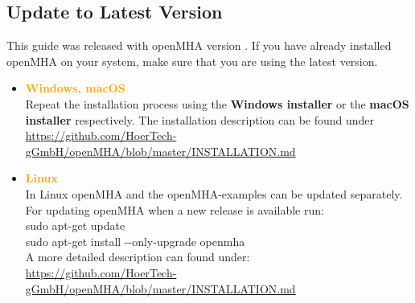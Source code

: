 \documentclass[11pt,a4paper,twoside]{article}
\newcommand{\+}{\discretionary{\mbox{\scriptsize$\hookleftarrow$}}{}{}}
\begin{document}

\subsection{Update to Latest Version}

This guide was released with openMHA version \MHAversion.
If you have already installed openMHA on your system, make
sure that you are using the latest version. \\
\begin{itemize}
\item \textcolor{orange}{\textbf{Windows, macOS}} \\
Repeat the installation process using the \textbf{Windows installer} or the \textbf{macOS installer} respectively. The installation description can be found under \url{https://github.com/HoerTech-gGmbH/openMHA/blob/master/INSTALLATION.md}
\item \textcolor{orange}{\textbf{Linux}} \\
In Linux openMHA and the openMHA-examples can be updated separately. For updating openMHA when a new release is available run: \\ 
{\ttfamily sudo apt-get update} \\
{{\ttfamily sudo apt-get install -{}-only-upgrade openmha}} \\
A more detailed description can found under: \\
\url{https://github.com/HoerTech-gGmbH/openMHA/blob/master/INSTALLATION.md}
\end{itemize}
\end{document}

